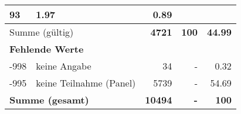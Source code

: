 \begin{longtable}{lXrrr}
       \num{93} &
       \num[round-mode=places,round-precision=2]{1,97} &
         \num[round-mode=places,round-precision=2]{0,89} \\
     \midrule
     \multicolumn{2}{l}{Summe (gültig)} &
       \textbf{\num{4721}} &
     \textbf{100} &
       \textbf{\num[round-mode=places,round-precision=2]{44,99}} \\
     \multicolumn{5}{l}{\textbf{Fehlende Werte}}\\
       -998 &
       keine Angabe &
         \num{34} &
        - &
         \num[round-mode=places,round-precision=2]{0,32} \\
       -995 &
       keine Teilnahme (Panel) &
         \num{5739} &
        - &
         \num[round-mode=places,round-precision=2]{54,69} \\
     \midrule
     \multicolumn{2}{l}{\textbf{Summe (gesamt)}} &
          \textbf{\num{10494}} &
        \textbf{-} &
        \textbf{100} \\
     \bottomrule
     \end{longtable}
     
